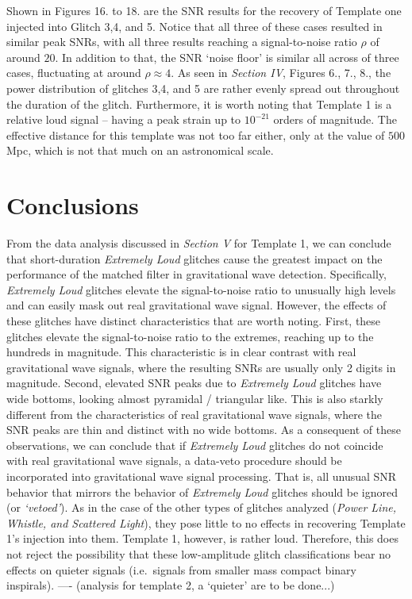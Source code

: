 \documentclass[reprint,
letterpaper,
 amsmath,amssymb,
 aps,
]{revtex4-2}
\begin{document}
Shown in Figures 16. to 18. are the SNR results for the recovery of Template one injected into Glitch 3,4, and 5. Notice that all three of these cases resulted in similar peak SNRs, with all three results reaching a signal-to-noise ratio $\rho$ of around $20$. In addition to that, the SNR `noise floor' is similar all across of three cases, fluctuating at around $\rho\approx 4$. As seen in  \textit{Section IV}, Figures 6., 7., 8., the power distribution of glitches 3,4, and 5 are rather evenly spread out throughout the duration of the glitch. Furthermore, it is worth noting that Template 1 is a relative loud signal – having a peak strain up to $10^{-21}$ orders of magnitude. The effective distance for this template was not too far either, only at the value of $500$ Mpc, which is not that much on an astronomical scale.

\section{Conclusions}
From the data analysis discussed in \textit{Section V} for Template 1, we can conclude that short-duration \textit{Extremely Loud} glitches cause the greatest impact on the performance of the matched filter in gravitational wave detection. Specifically, \textit{Extremely Loud} glitches elevate the signal-to-noise ratio to unusually high levels and can easily mask out real gravitational wave signal. However, the effects of these glitches have distinct characteristics that are worth noting. First, these glitches elevate the signal-to-noise ratio to the extremes, reaching up to the hundreds in magnitude. This characteristic is in clear contrast with real gravitational wave signals, where the resulting SNRs are usually only 2 digits in magnitude. Second, elevated SNR peaks due to \textit{Extremely Loud} glitches have wide bottoms, looking almost pyramidal / triangular like. This is also starkly different from the characteristics of real gravitational wave signals, where the SNR peaks are thin and distinct with no wide bottoms. As a consequent of these observations, we can conclude that if \textit{Extremely Loud} glitches do not coincide with real gravitational wave signals, a data-veto procedure should be incorporated into gravitational wave signal processing. That is, all unusual SNR behavior that mirrors the behavior of \textit{Extremely Loud} glitches should be ignored (or \textit{`vetoed'}). As in the case of the other types of glitches analyzed (\textit{Power Line, Whistle, and Scattered Light}), they pose little to no effects in recovering Template 1's injection into them. Template 1, however, is rather loud. Therefore, this does not reject the possibility that these low-amplitude glitch classifications bear no effects on quieter signals (i.e.\ signals from smaller mass compact binary inspirals). ---- (analysis for template 2, a `quieter' are to be done...)
\end{document}
